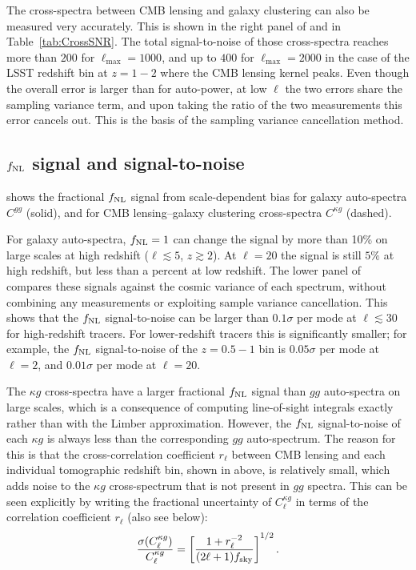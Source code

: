 \documentclass[prd,superscriptaddress,floatfix,notitlepage,nofootinbib,reprint]{revtex4-1} %
\begin{document}
The cross-spectra between CMB lensing and galaxy clustering can also be measured very accurately.
This is shown in the right panel of  and in Table~\ref{tab:CrossSNR}.
The total signal-to-noise of those cross-spectra reaches more than $200$ for $\ell_\mathrm{max}=1000$, and up to $400$ for $\ell_\mathrm{max}=2000$ in the case of the LSST redshift bin at $z=1-2$ where the CMB lensing kernel peaks.
Even though the overall error is larger than for auto-power, at low $\ell$ 
the two errors share the sampling variance term, and upon taking the 
ratio of the two measurements this error cancels out. This is the 
basis of the sampling variance cancellation method. 





\subsection{\texorpdfstring{${f_\mathrm{NL}}$}{fNL} signal and signal-to-noise}


 shows the fractional ${f_\mathrm{NL}}$ signal from scale-dependent bias for galaxy auto-spectra $C^{gg}$ (solid), and for CMB lensing--galaxy clustering cross-spectra $C^{\kappa g}$ (dashed).


For galaxy auto-spectra, ${f_\mathrm{NL}}=1$ can change the signal by more than 10\% on large scales at high redshift ($\ell\lesssim 5$, $z\gtrsim 2$).
At $\ell=20$ the signal is still $5\%$ at high redshift, but less than a percent at low redshift. 
The lower panel of  compares these signals against the cosmic variance of each spectrum, without combining any measurements or exploiting sample variance cancellation.
This shows that the ${f_\mathrm{NL}}$ signal-to-noise can be larger than $0.1\sigma$ per mode at $\ell\lesssim 30$ for high-redshift tracers.
For lower-redshift tracers this is significantly smaller; for example, the ${f_\mathrm{NL}}$ signal-to-noise of the $z=0.5-1$ bin is $0.05\sigma$ per mode at $\ell=2$, and $0.01\sigma$ per mode at $\ell=20$.

The $\kappa g$ cross-spectra have a larger fractional ${f_\mathrm{NL}}$ signal than $gg$ auto-spectra on large scales, which is a consequence of computing line-of-sight integrals exactly rather than with the Limber approximation.
However, the ${f_\mathrm{NL}}$ signal-to-noise of each $\kappa g$ is always less than the corresponding $gg$ auto-spectrum.
The reason for this is that the cross-correlation coefficient $r_\ell$ between CMB lensing and each individual tomographic redshift bin, shown in  above,
is relatively small, which adds noise to the $\kappa g$ cross-spectrum that is not present in $gg$ spectra.
This can be seen explicitly by writing the fractional uncertainty of $C_\ell^{\kappa g}$ in terms of the correlation coefficient $r_\ell$ (also see  below):
\begin{align}
  \label{eq:47}
\frac{\sigma(C_\ell^{\kappa g})}{C_\ell^{\kappa g}}
=
\left[\frac{1+r_\ell^{-2}}{(2\ell+1){f_\mathrm{sky}}}\right]^{1/2}.
\end{align}
\end{document}
